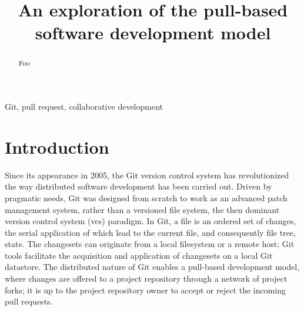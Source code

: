 \documentclass[conference]{IEEEtran}
\begin{document}
\title{An exploration of the pull-based software development model}

\author{
}

\maketitle

\begin{abstract}
Foo
\end{abstract}

\begin{IEEEkeywords}
Git, pull request, collaborative development
\end{IEEEkeywords}

\section{Introduction}

Since its appearance in 2005, the Git version control system has revolutionized
the way distributed software development has been carried out. Driven by
pragmatic needs, Git was designed from scratch to work as an advanced patch
management system, rather than a versioned file system, the then dominant
version control system ({\sc vcs}) paradigm. In Git, a file is an ordered set of
changes, the serial application of which lead to the current file, and
consequently file tree, state. The changesets can originate from a local
filesystem or a remote host; Git tools facilitate the acquisition and
application of changesets on a local Git datastore. The distributed nature
of Git enables a pull-based development model, where changes are offered
to a project repository through a network of project forks; it is up to the
project repository owner to accept or reject the incoming pull requests.
\end{document}
